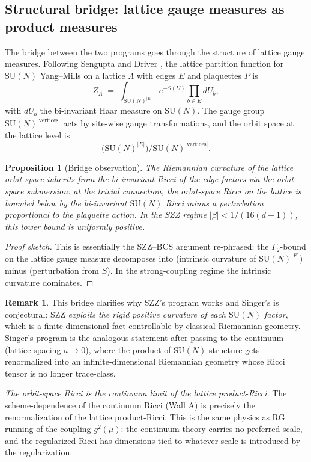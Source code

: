 \documentclass[11pt,letterpaper]{article}
\newtheorem{proposition}[theorem]{Proposition}
\theoremstyle{definition}
\newtheorem{remark}[theorem]{Remark}
\begin{document}
\subsection{Structural bridge: lattice gauge measures as product measures}

The bridge between the two programs goes through the structure of lattice gauge measures. Following Sengupta \cite{Sengupta1997} and Driver \cite{Driver1989}, the lattice partition function for $\mathrm{SU}(N)$ Yang--Mills on a lattice $\Lambda$ with edges $E$ and plaquettes $P$ is
\[
Z_\Lambda \;=\; \int_{\mathrm{SU}(N)^{|E|}} e^{-S(U)} \prod_{b\in E} dU_b,
\]
with $dU_b$ the bi-invariant Haar measure on $\mathrm{SU}(N)$. The gauge group $\mathrm{SU}(N)^{|\mathrm{vertices}|}$ acts by site-wise gauge transformations, and the orbit space at the lattice level is
\[
\bigl(\mathrm{SU}(N)^{|E|}\bigr)/\mathrm{SU}(N)^{|\mathrm{vertices}|}.
\]

\begin{proposition}[Bridge observation]\label{prop:bridge}
The Riemannian curvature of the lattice orbit space inherits from the bi-invariant Ricci of the edge factors via the orbit-space submersion: at the trivial connection, the orbit-space Ricci on the lattice is bounded below by the bi-invariant $\mathrm{SU}(N)$ Ricci minus a perturbation proportional to the plaquette action. In the SZZ regime $|\beta| < 1/(16(d-1))$, this lower bound is uniformly positive.
\end{proposition}

\begin{proof}[Proof sketch]
This is essentially the SZZ--BCS argument re-phrased: the $\Gamma_2$-bound on the lattice gauge measure decomposes into (intrinsic curvature of $\mathrm{SU}(N)^{|E|}$) minus (perturbation from $S$). In the strong-coupling regime the intrinsic curvature dominates.
\end{proof}

\begin{remark}\label{rmk:bridge-implication}
This bridge clarifies why SZZ's program works and Singer's is conjectural: SZZ \emph{exploits the rigid positive curvature of each $\mathrm{SU}(N)$ factor}, which is a finite-dimensional fact controllable by classical Riemannian geometry. Singer's program is the analogous statement after passing to the continuum (lattice spacing $a\to 0$), where the product-of-$\mathrm{SU}(N)$ structure gets renormalized into an infinite-dimensional Riemannian geometry whose Ricci tensor is no longer trace-class.

\emph{The orbit-space Ricci is the continuum limit of the lattice product-Ricci.} The scheme-dependence of the continuum Ricci (Wall A) is precisely the renormalization of the lattice product-Ricci. This is the same physics as RG running of the coupling $g^2(\mu)$: the continuum theory carries no preferred scale, and the regularized Ricci has dimensions tied to whatever scale is introduced by the regularization.
\end{remark}
\end{document}
